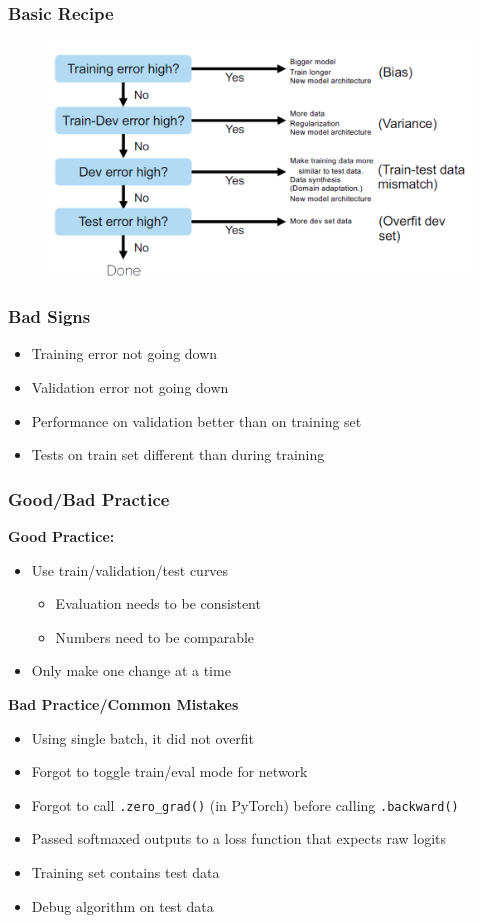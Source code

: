 \documentclass[10pt,a4paper]{article}
\begin{document}
\subsubsection{Basic Recipe}
\begin{figure}[H]
	\includegraphics[width=0.7\columnwidth]{figures/recipe.png}
\end{figure}

\subsubsection{Bad Signs}
\begin{itemize}
	\item Training error not going down
	\item Validation error not going down
	\item Performance on validation better than on training set
	\item Tests on train set different than during training
\end{itemize}

\subsubsection{Good/Bad Practice}
\textbf{Good Practice:}
\begin{itemize}
	\item Use train/validation/test curves
	\begin{itemize}
		\item Evaluation needs to be consistent
		\item Numbers need to be comparable
	\end{itemize}
	\item Only make one change at a time
\end{itemize}

\textbf{Bad Practice/Common Mistakes}
\begin{itemize}
	\item Using single batch, it did not overfit
	\item Forgot to toggle train/eval mode for network
	\item Forgot to call \lstinline|.zero_grad()| (in PyTorch) before calling \lstinline|.backward()|
	\item Passed softmaxed outputs to a loss function that expects raw logits
	\item Training set contains test data
	\item Debug algorithm on test data
\end{itemize}
\end{document}
